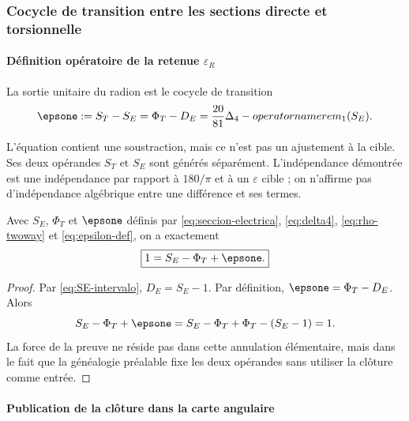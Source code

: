 \subsubsection{Cocycle de transition entre les sections directe et torsionnelle}

\paragraph{Définition opératoire de la retenue \(\varepsilon_R\)}

\begin{definition}
La sortie unitaire du radion est le cocycle de transition
\begin{equation}
\epsone:=S_T-S_E
=\Phi_T-D_E
=\frac{20}{81}\Delta_4-operatorname{rem}_1(S_E).
\label{eq:epsilon-def}
\end{equation}
\end{definition}

L'équation contient une soustraction, mais ce n'est pas un ajustement à la cible. Ses deux
opérandes \(S_T\) et \(S_E\) sont générés séparément. L'indépendance
démontrée est une indépendance par rapport à \(180/\pi\) et à un
\(\varepsilon\) cible ; on n'affirme pas d'indépendance algébrique entre une
différence et ses termes.

\begin{theorem}
Avec \(S_E\), \(\Phi_T\) et \(\epsone\) définis par
\eqref{eq:seccion-electrica}, \eqref{eq:delta4}, \eqref{eq:rho-twoway} et
\eqref{eq:epsilon-def}, on a exactement
\begin{equation}
\boxed{1=S_E-\Phi_T+\epsone.}
\label{eq:cierre-unitario}
\end{equation}
\end{theorem}
\begin{proof}
Par \eqref{eq:SE-intervalo}, \(D_E=S_E-1\). Par définition,
\(\epsone=\Phi_T-D_E\). Alors
\[
S_E-\Phi_T+\epsone
=S_E-\Phi_T+\Phi_T-(S_E-1)=1.
\]
La force de la preuve ne réside pas dans cette annulation élémentaire, mais dans le fait que la
généalogie préalable fixe les deux opérandes sans utiliser la clôture comme entrée.
\end{proof}

\paragraph{Publication de la clôture dans la carte angulaire}

